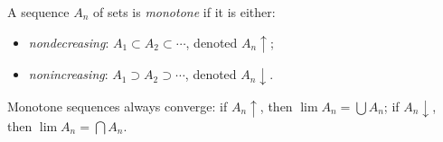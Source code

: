 A sequence $A_n$ of sets is \textit{monotone} if it is either:
\begin{itemize}
\item \textit{nondecreasing}: $A_1 \subset A_2 \subset \cdots$, denoted $A_n \uparrow$;
\item \textit{nonincreasing}: $A_1 \supset A_2 \supset \cdots$, denoted $A_n \downarrow$.
\end{itemize}

Monotone sequences always converge: if $A_n \uparrow$, then $\lim A_n = \bigcup A_n$; if $A_n \downarrow$, then $\lim A_n = \bigcap A_n$.
